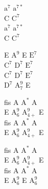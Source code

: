 \begin{chord}
    $\mathrm{a^7}$ $\mathrm{a^{7*}}$\\
    C $\mathrm{C^7}$\\
    $\mathrm{a^7}$ $\mathrm{a^{7*}}$\\
    C $\mathrm{C^7}$

    E $\mathrm{A^9}$ E $\mathrm{E^7}$\\
    $\mathrm{C^7}$ $\mathrm{D^7}$ $\mathrm{E^7}$\\
    $\mathrm{C^7}$ $\mathrm{D^7}$ $\mathrm{E^7}$\\
    $\mathrm{D^7}$ $\mathrm{A_7^9}$ E

    fis A $\mathrm{A^*}$ A\\
    E $\mathrm{A_6^9}$ $\mathrm{A_{4+}^9}$ E\\
    fis A $\mathrm{A^*}$ A\\
    E $\mathrm{A_6^9}$ $\mathrm{A_{4+}^9}$ E

    fis A $\mathrm{A^*}$ A\\
    E $\mathrm{A_6^9}$ $\mathrm{A_{4+}^9}$ E\\
    fis A $\mathrm{A^*}$ A\\
    E $\mathrm{A_6^9}$ E $\mathrm{A_6^9}$
\end{chord}
